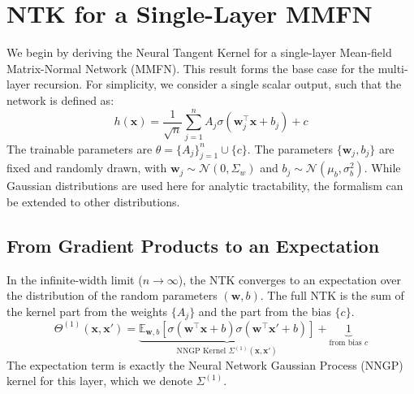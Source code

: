\documentclass[12pt]{article}
\begin{document}
\section{NTK for a Single-Layer MMFN}
\label{sec:single_layer_mmfn}
We begin by deriving the Neural Tangent Kernel for a single-layer Mean-field Matrix-Normal Network (MMFN). This result forms the base case for the multi-layer recursion. For simplicity, we consider a single scalar output, such that the network is defined as:
\begin{equation}
    h(\bm{x}) = \frac{1}{\sqrt{n}} \sum_{j=1}^n A_j \sigma(\bm{w}_j^\top \bm{x} + b_j) + c
\end{equation}
The trainable parameters are $\theta = \{A_j\}_{j=1}^n \cup \{c\}$. The parameters $\{\bm{w}_j, b_j\}$ are fixed and randomly drawn, with $\bm{w}_j \sim \mathcal{N}(0, \Sigma_w)$ and $b_j \sim \mathcal{N}(\mu_b, \sigma_b^2)$. While Gaussian distributions are used here for analytic tractability, the formalism can be extended to other distributions.

\subsection{From Gradient Products to an Expectation}
In the infinite-width limit ($n \to \infty$), the NTK converges to an expectation over the distribution of the random parameters $(\bm{w}, b)$. The full NTK is the sum of the kernel part from the weights $\{A_j\}$ and the part from the bias $\{c\}$.
\begin{equation}
\label{eq:ntk_expectation}
    \Theta^{(1)}(\bm{x}, \bm{x}') = \underbrace{\mathbb{E}_{\bm{w},b} \left[ \sigma(\bm{w}^\top \bm{x} + b)\sigma(\bm{w}^\top \bm{x}' + b) \right]}_{\text{NNGP Kernel } \Sigma^{(1)}(\bm{x}, \bm{x}')} + \underbrace{1}_{\text{from bias } c}
\end{equation}
The expectation term is exactly the Neural Network Gaussian Process (NNGP) kernel for this layer, which we denote $\Sigma^{(1)}$.
\end{document}
